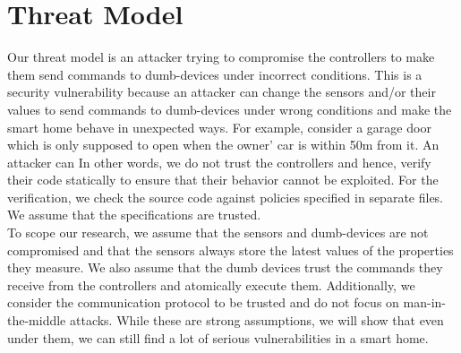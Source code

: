 \documentclass{article}
\begin{document}
\section{Threat Model}
Our threat model is an attacker trying to compromise the controllers to make them send commands to dumb-devices under incorrect conditions. This is a security vulnerability because an attacker can change the sensors and/or their values to send commands to dumb-devices under wrong conditions and make the smart home behave in unexpected ways. For example, consider a garage door which is only supposed to open when the owner' car is within 50m from it. An attacker can 
In other words, we do not trust the controllers and hence, verify their code statically to ensure that their behavior cannot be exploited. For the verification, we check the source code against policies specified in separate files. We assume that the specifications are trusted.\\

\noindent To scope our research, we assume that the sensors and dumb-devices are not compromised and that the sensors always store the latest values of the properties they measure. We also assume that the dumb devices trust the commands they receive from the controllers and atomically execute them. Additionally, we consider the communication protocol to be trusted and do not focus on man-in-the-middle attacks. 
While these are strong assumptions, we will show that even under them, we can still find a lot of serious vulnerabilities in a smart home. 


\end{document}
